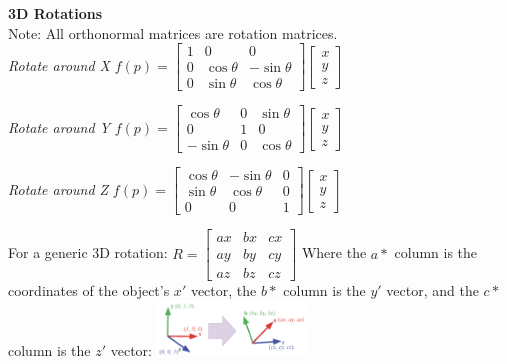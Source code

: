 \documentclass[letterpaper, 8pt]{extarticle}
\begin{document}
\begin{multicols*}{4}
\textbf{3D Rotations} \\
Note: All orthonormal matrices are rotation matrices. \\
\textit{Rotate around X}
\(
f(p) = \begin{bmatrix}
    1 & 0           & 0            \\
    0 & \cos \theta & -\sin \theta \\
    0 & \sin \theta & \cos \theta
\end{bmatrix}
\begin{bmatrix}
    x \\ y \\ z
\end{bmatrix}
\)

\textit{Rotate around Y}
\(
f(p) = \begin{bmatrix}
    \cos \theta  & 0 & \sin \theta \\
    0            & 1 & 0           \\
    -\sin \theta & 0 & \cos \theta
\end{bmatrix}
\begin{bmatrix}
    x \\ y \\ z
\end{bmatrix}
\)

\textit{Rotate around Z}
\(
f(p) = \begin{bmatrix}
    \cos \theta & -\sin \theta & 0 \\
    \sin \theta & \cos \theta  & 0 \\
    0           & 0            & 1
\end{bmatrix}
\begin{bmatrix}
    x \\ y \\ z
\end{bmatrix}
\)

For a generic 3D rotation:
\(
R =
\begin{bmatrix}
    ax & bx & cx \\
    ay & by & cy \\
    az & bz & cz
\end{bmatrix}
\)
Where the \(a*\) column is the coordinates of the object's \(x'\) vector,
the \(b*\) column is the \(y'\) vector,
and the \(c*\) column is the \(z'\) vector:
\includegraphics[width=4cm]{3d-rotation.png}


\end{multicols*}
\end{document}
